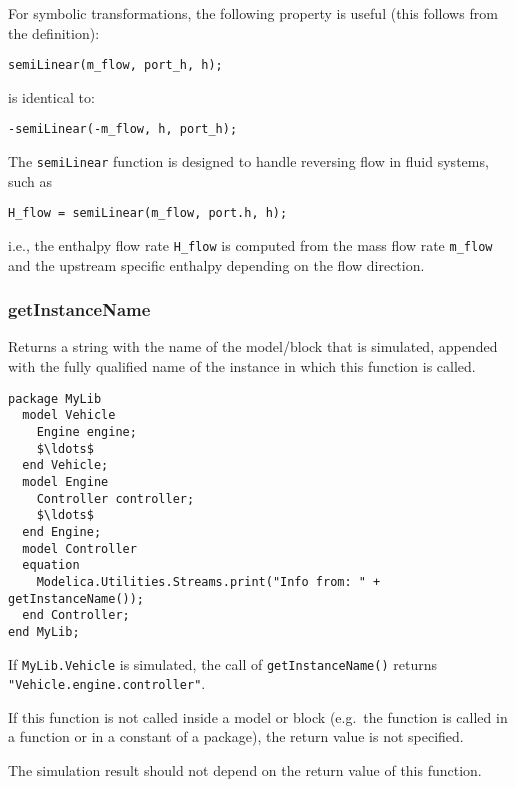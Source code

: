 \begin{nonnormative}
For symbolic transformations, the following property is useful
(this follows from the definition):
\begin{lstlisting}[language=modelica]
semiLinear(m_flow, port_h, h);
\end{lstlisting}
is identical to:
\begin{lstlisting}[language=modelica]
-semiLinear(-m_flow, h, port_h);
\end{lstlisting}

The \lstinline!semiLinear! function is designed to handle reversing
flow in fluid systems, such as
\begin{lstlisting}[language=modelica]
H_flow = semiLinear(m_flow, port.h, h);
\end{lstlisting}
i.e., the enthalpy flow rate \lstinline!H_flow! is computed from the
mass flow rate \lstinline!m_flow! and the upstream specific enthalpy
depending on the flow direction.
\end{nonnormative}

\subsubsection{getInstanceName}\label{getinstancename}

Returns a string with the name of the model/block that is simulated,
appended with the fully qualified name of the instance in which this
function is called.

\begin{example}
\begin{lstlisting}[language=modelica]
package MyLib
  model Vehicle
    Engine engine;
    $\ldots$
  end Vehicle;
  model Engine
    Controller controller;
    $\ldots$
  end Engine;
  model Controller
  equation
    Modelica.Utilities.Streams.print("Info from: " + getInstanceName());
  end Controller;
end MyLib;
\end{lstlisting}
If \lstinline!MyLib.Vehicle! is simulated, the call of \lstinline!getInstanceName()!
returns \lstinline!"Vehicle.engine.controller"!.
\end{example}

If this function is not called inside a model or block (e.g.\ the
function is called in a function or in a constant of a package), the
return value is not specified.

\begin{nonnormative}
The simulation result should not depend on the return value of this function.
\end{nonnormative}

